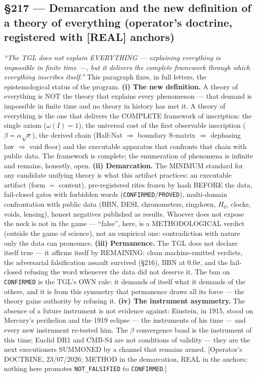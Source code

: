 \documentclass[11pt]{article}
\theoremstyle{definition}\newtheorem{deriv}{Derivation}
\begin{document}
\subsection*{\S217 --- Demarcation and the new definition of a theory of everything (operator's doctrine, registered with [REAL] anchors)}\emph{``The TGL does not explain EVERYTHING --- explaining everything is impossible in finite time ---, but it delivers the complete framework through which everything inscribes itself.''} This paragraph fixes, in full letters, the epistemological status of the program. \textbf{(i) The new definition.} A theory of everything is NOT the theory that explains every phenomenon --- that demand is impossible in finite time and no theory in history has met it. A theory of everything is the one that delivers the COMPLETE framework of inscription: the single axiom ($\omega(I)=1$), the universal cost of the first observable inscription ($\beta=\alpha\sqrt{e}$), the derived chain (Half-Nat $\Rightarrow$ boundary S-matrix $\Rightarrow$ dephasing law $\Rightarrow$ void floor) and the executable apparatus that confronts that chain with public data. The framework is complete; the enumeration of phenomena is infinite and remains, honestly, open. \textbf{(ii) Demarcation.} The MINIMUM standard for any candidate unifying theory is what this artifact practices: an executable artifact (form $=$ content), pre-registered rites frozen by hash BEFORE the data, fail-closed gates with forbidden words (\texttt{CONFIRMED}/\texttt{PROVED}), multi-domain confrontation with public data (BBN, DESI, chronometers, ringdown, $H_0$, clocks, voids, lensing), honest negatives published as results. Whoever does not expose the neck is not in the game --- ``false'', here, is a METHODOLOGICAL verdict (outside the game of science), not an empirical one: contradiction with nature only the data can pronounce. \textbf{(iii) Permanence.} The TGL does not declare itself true --- it affirms itself by REMAINING: clean machine-emitted verdicts, the adversarial falsification assault survived (\S216), BBN at $0.0\sigma$, and the fail-closed refusing the word whenever the data did not deserve it. The ban on \texttt{CONFIRMED} is the TGL's OWN rule: it demands of itself what it demands of the others, and it is from this symmetry that permanence draws all its force --- the theory gains authority by refusing it. \textbf{(iv) The instrument asymmetry.} The absence of a future instrument is not evidence against: Einstein, in 1915, stood on Mercury's perihelion and the 1919 eclipse --- the instruments of his time --- and every new instrument re-tested him. The $\beta$ convergence band is the instrument of this time; Euclid DR1 and CMB-S4 are not conditions of validity --- they are the next executioners SUMMONED by a channel that remains armed. [Operator's DOCTRINE, 23/07/2026; METHOD in the demarcation, REAL in the anchors; nothing here promotes \texttt{NOT\_FALSIFIED} to \texttt{CONFIRMED}.]
\end{document}
